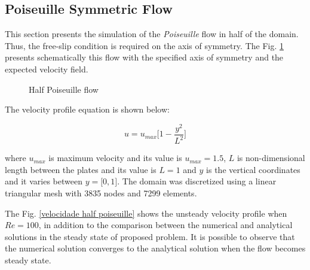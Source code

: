 \documentclass[10pt,fleqn,a4paper,twoside]{article}
\begin{document}
\subsection{Poiseuille Symmetric Flow} \label{half poiseuille sec}

This section presents the simulation of the \textit{Poiseuille} flow 
in half of the domain. Thus, the free-slip condition is required on 
the axis of symmetry. The Fig. \ref{half poiseuille}  presents schematically 
this flow with the specified axis of symmetry and the expected velocity 
field.

\begin{figure}[H]
\begin{center}
\end{center}
\label{half poiseuille}
\caption{Half Poiseuille flow}
\end{figure}

\noindent
The velocity profile equation is shown below:

\begin{equation}
 u = u_{max} \big[ 1 - \frac{y^{2}}{L^{2}} \big]
\end{equation}


\medskip
where $u_{max}$ is maximum velocity and its value is 
$u_{max} = 1.5$, $L$ is non-dimensional length 
between the plates and its value is 
$L = 1$
and $y$ is the vertical coordinates and it varies 
between $y = \big[ 0,1 \big]$.
The domain was discretized using a linear triangular mesh
with 3835 nodes and 7299 elements.


\medskip
The Fig. \ref{velocidade half poiseuille}  shows the unsteady velocity profile
when $Re=100$, in addition to the comparison between the 
numerical and analytical solutions in the steady state of
proposed problem. It is possible to observe that the numerical
solution converges to the analytical solution when the flow
becomes steady state.
\end{document}
